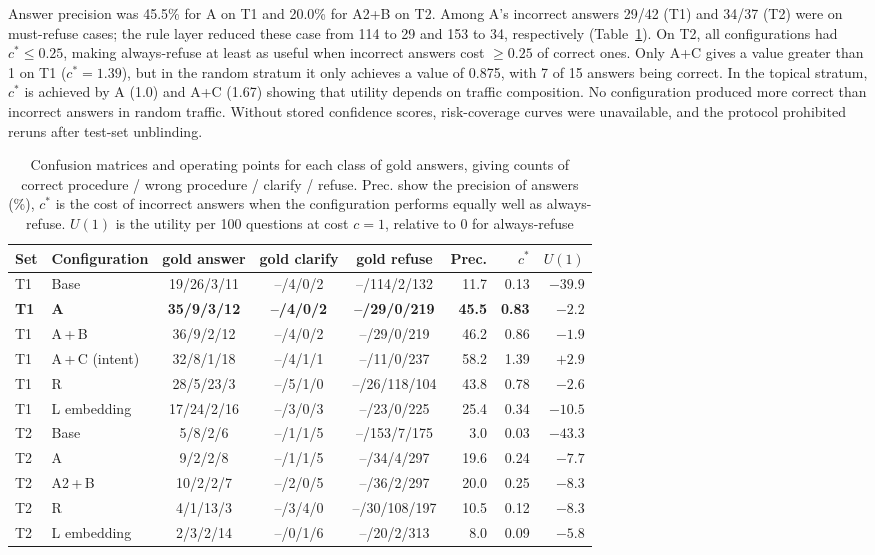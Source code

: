 \documentclass[runningheads]{llncs}
\begin{document}
{Answer precision was 45.5\% for A on T1 and 20.0\% for A2+B on T2. Among A's incorrect answers 29/42 (T1) and 34/37 (T2) were on must-refuse cases; the rule layer reduced these case from 114 to 29 and 153 to 34, respectively (Table~\ref{tab:confusion}). On T2, all configurations had $c^* \leq 0.25$, making always-refuse at least as useful when incorrect answers cost $\geq0.25$ of correct ones. Only A+C gives a value greater than 1 on T1 ($c^* = 1.39$), but in the random stratum it only achieves a value of 0.875, with 7 of 15 answers being correct. In the topical stratum, $c^*$ is achieved by A (1.0) and A+C (1.67) showing that utility depends on traffic composition. No configuration produced more correct than incorrect answers in random traffic. Without stored confidence scores, risk-coverage curves were unavailable, and the protocol prohibited reruns after test-set unblinding.}

\begin{table}[tb]
\caption{Confusion matrices and operating points for each class of gold answers, giving counts of correct procedure / wrong procedure / clarify / refuse. Prec. show the precision of answers (\%), $c^*$ is the cost of incorrect answers when the configuration performs equally well as always-refuse. $U(1)$ is the utility per 100 questions at cost $c=1$, relative to 0 for always-refuse}\label{tab:confusion}
\centering\scriptsize\setlength{\tabcolsep}{3pt}%
\begin{tabular}{@{}llccc r r r@{}}
\toprule
Set & Configuration & gold answer & gold clarify & gold refuse & Prec. & $c^*$ & $U(1)$ \\
\midrule
T1 & Base & 19/26/3/11 & --/4/0/2 & --/114/2/132 & 11.7 & 0.13 & $-39.9$ \\
\bfseries T1 & \bfseries A & \bfseries 35/9/3/12 & \bfseries --/4/0/2 & \bfseries --/29/0/219 & \bfseries 45.5 & \bfseries 0.83 & \bfseries\boldmath $-2.2$ \\
T1 & A\,+\,B & 36/9/2/12 & --/4/0/2 & --/29/0/219 & 46.2 & 0.86 & $-1.9$ \\
T1 & A\,+\,C (intent) & 32/8/1/18 & --/4/1/1 & --/11/0/237 & 58.2 & 1.39 & $+2.9$ \\
T1 & R & 28/5/23/3 & --/5/1/0 & --/26/118/104 & 43.8 & 0.78 & $-2.6$ \\
T1 & L embedding & 17/24/2/16 & --/3/0/3 & --/23/0/225 & 25.4 & 0.34 & $-10.5$ \\
\midrule
T2 & Base & 5/8/2/6 & --/1/1/5 & --/153/7/175 & 3.0 & 0.03 & $-43.3$ \\
T2 & A & 9/2/2/8 & --/1/1/5 & --/34/4/297 & 19.6 & 0.24 & $-7.7$ \\
T2 & A2\,+\,B & 10/2/2/7 & --/2/0/5 & --/36/2/297 & 20.0 & 0.25 & $-8.3$ \\
T2 & R & 4/1/13/3 & --/3/4/0 & --/30/108/197 & 10.5 & 0.12 & $-8.3$ \\
T2 & L embedding & 2/3/2/14 & --/0/1/6 & --/20/2/313 & 8.0 & 0.09 & $-5.8$ \\
\bottomrule
\end{tabular}
\end{table}
\end{document}
